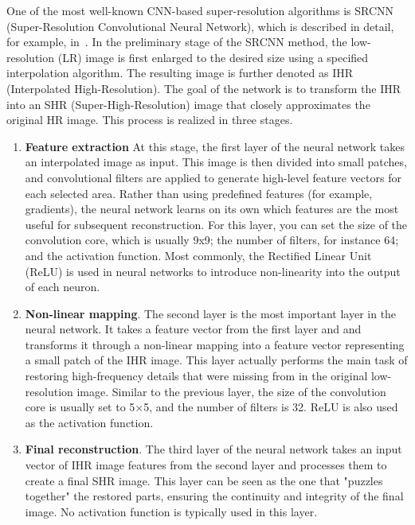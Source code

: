 \documentclass{ieeeaccess}
\begin{document}
One of the most well-known CNN-based super-resolution algorithms is SRCNN (Super-Resolution Convolutional Neural Network), which is described in detail, for example, in~\cite{Dong_SR}.
In the preliminary stage of the SRCNN method, the low-resolution (LR) image is first enlarged to the desired size using a specified interpolation algorithm.
The resulting image is further denoted as IHR (Interpolated High-Resolution). The goal of the network is to transform the IHR into an SHR (Super-High-Resolution) image that closely approximates the original HR image. This process is realized in three stages.
\begin{enumerate}
    \item \textbf{Feature extraction}
At this stage, the first layer of the neural network takes an interpolated image as input. This image is then divided  into small patches, and convolutional filters are applied to generate high-level feature vectors for each selected area.
Rather than  using predefined features (for example, gradients), the  neural network learns on its own  which features are the most useful for subsequent reconstruction.
For this layer, you can set the size of the convolution core, which is usually 9x9; the number of filters,  for instance 64; and the activation function. Most commonly, the Rectified Linear Unit (ReLU) is used in neural networks to introduce non-linearity into the output of each neuron.

    \item \textbf{Non-linear mapping}.
The second layer is the most important layer in the neural network. It takes a feature vector from the first layer and and transforms it through a non-linear mapping into a feature vector representing a small patch of the IHR image.
This layer actually performs the main task of restoring high-frequency details that were  missing from in the original low-resolution image.
Similar to the previous layer, the size of the convolution core is usually set to 5×5, and the number of filters is 32. ReLU is also used as the activation function.

    \item \textbf{Final reconstruction}.
The third layer of the neural network takes an input vector of IHR image features from the second layer and processes them to create a final SHR image. This layer can be seen as the one that "puzzles together" the restored parts, ensuring the continuity and integrity of the final image. 
No activation function is typically used in this layer.
\end{enumerate}
\end{document}
